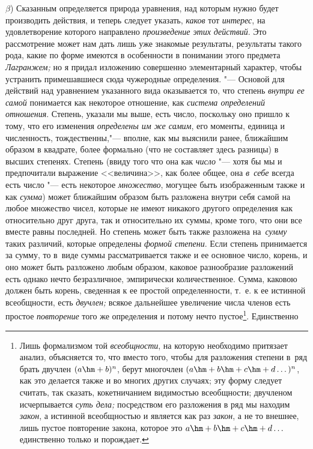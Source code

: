 $\beta$) Сказанным определяется природа уравнения, над которым нужно будет
производить действия, и теперь следует указать, {\em каков} тот {\em интерес},
на удовлетворение которого направлено {\em произведение этих действий}. Это
рассмотрение может нам дать лишь уже знакомые результаты, результаты такого
рода, какие по форме имеются в особенности в понимании этого предмета
{\em Лагранжем;} но я придал изложению совершенно элементарный характер, чтобы
устранить примешавшиеся сюда чужеродные определения. "--- Основой для действий
над уравнением указанного вида оказывается то, что степень
{\em внутри ее самой} понимается как некоторое отношение, как
{\em система определений отношения}. Степень, указали мы выше, есть число,
поскольку оно пришло к тому, что его изменения {\em определены им же самим},
его моменты, единица и численность, тождественны,"--- вполне, как мы выяснили
ранее, ближайшим образом в квадрате, более формально (что не составляет здесь
разницы) в высших степенях. Степень (ввиду того что она как {\em число} "---
хотя бы мы и предпочитали выражение <<величина>>, как более общее, она
{\em в~себе} всегда есть число "--- есть некоторое {\em множество}, могущее
быть изображенным также и как {\em сумма}) может ближайшим образом быть
разложена внутри себя самой на любое множество чисел, которые не имеют никакого
другого определения как относительно друг друга, так и относительно их суммы,
кроме того, что они все вместе равны последней. Но степень может быть также
разложена на~{\em сумму} таких различий, которые определены
{\em формой степени}. Если степень принимается за сумму, то в~виде суммы
рассматривается также и ее основное число, корень, и оно может быть разложено
любым образом, каковое разнообразие разложений есть однако нечто безразличное,
эмпирически количественное. Сумма, каковою должен быть корень, сведенная к ее
простой определенности, т.~е. к ее истинной всеобщности, есть {\em двучлен;}
всякое дальнейшее увеличение числа членов есть простое {\em повторение} того же
определения и потому нечто пустое\footnote{Лишь формализмом той
{\em всеобщности}, на которую необходимо притязает анализ, объясняется то, что
вместо того, чтобы для разложения степени в~ряд брать двучлен $(a\hm+b)^n$,
берут многочлен $(a\hm+b\hm+c\hm+d\dots)^n$, как это делается также и во многих
других случаях; эту форму следует считать, так сказать, кокетничанием
видимостью всеобщности; двучленом исчерпывается {\em суть дела;} посредством
его разложения в ряд мы находим {\em закон}, а истинной всеобщностью и является
как раз {\em закон}, а не то внешнее, лишь пустое повторение закона, которое
это $a\hm+b\hm+c\hm+d\dots$ единственно только и порождает.}. Единственно
